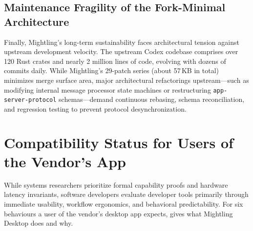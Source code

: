 \documentclass[11pt]{article}
\newcommand{\code}[1]{\texttt{#1}}
\begin{document}
\subsection{Maintenance Fragility of the Fork-Minimal Architecture}

Finally, Mightling's long-term sustainability faces architectural tension against upstream development velocity.
The upstream Codex codebase comprises over 120 Rust crates and nearly 2 million lines of code, evolving with dozens of
commits daily. While Mightling's 29-patch series (about 57\,KB in total) minimizes merge surface area, major architectural
refactorings upstream—such as modifying internal message processor state machines or restructuring
\code{app-server-protocol} schemas—demand continuous rebasing, schema reconciliation, and regression testing
to prevent protocol desynchronization.

\section{Compatibility Status for Users of the Vendor's App}
\label{sec:user-incompatibilities}

While systems researchers prioritize formal capability proofs and hardware latency invariants, software developers
evaluate developer tools primarily through immediate usability, workflow ergonomics, and behavioral predictability.
For six behaviours a user of the vendor's desktop app expects,  gives what Mightling
Desktop does and why.
\end{document}
